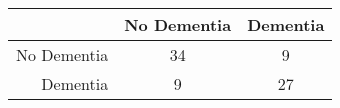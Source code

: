 \begin{table}[ht]
\centering
\begin{tabular}{r|c|c}
  \hline
 & No Dementia & Dementia \\ 
  \hline
No Dementia & 34 & 9 \\ 
  Dementia & 9 & 27 \\ 
   \hline
\end{tabular}
\end{table}
